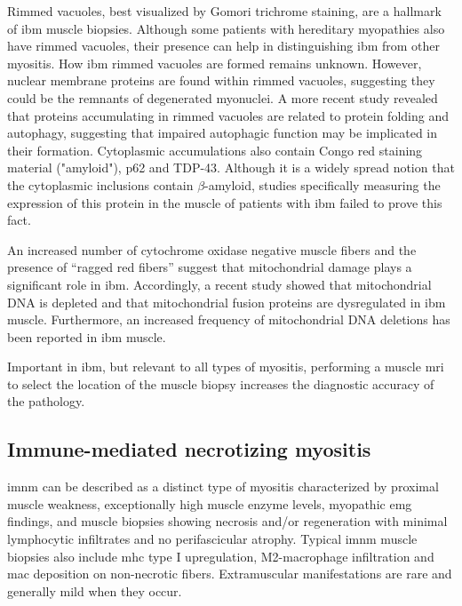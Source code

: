 Rimmed vacuoles, best visualized by Gomori trichrome staining, are a hallmark of \gls{ibm} muscle biopsies. Although some patients with hereditary myopathies also have rimmed vacuoles, their presence can help in distinguishing \gls{ibm} from other myositis.\cite{Dalakas2002} How \gls{ibm} rimmed vacuoles are formed remains unknown. However, nuclear membrane proteins are found within rimmed vacuoles, suggesting they could be the remnants of degenerated myonuclei.\cite{Greenberg2006,Nalbantoglu1994} A more recent study revealed that proteins accumulating in rimmed vacuoles are related to protein folding and autophagy, suggesting that impaired autophagic function may be implicated in their formation.\cite{Guttsches2017} Cytoplasmic accumulations also contain Congo red staining material ("amyloid"), p62 and TDP-43.\cite{Dalakas2002} Although it is a widely spread notion that the cytoplasmic inclusions contain $\beta$-amyloid, studies specifically measuring the expression of this protein in the muscle of patients with \gls{ibm} failed to prove this fact.\cite{Greenberg2010,Nalbantoglu1994}

An increased number of cytochrome oxidase negative muscle fibers and the presence of “ragged red fibers” suggest that mitochondrial damage plays a significant role in \gls{ibm}.\cite{Dalakas2002} Accordingly, a recent study showed that mitochondrial DNA is depleted and that mitochondrial fusion proteins are dysregulated in \gls{ibm} muscle.\cite{CatalanGarcia2016} Furthermore, an increased frequency of mitochondrial DNA deletions has been reported in \gls{ibm} muscle.\cite{Rygiel2016}

Important in \gls{ibm}, but relevant to all types of myositis, performing a muscle \gls{mri} to select the location of the muscle biopsy increases the diagnostic accuracy of the pathology.\cite{VanDeVlekkert2015}

\subsection{Immune-mediated necrotizing myositis}

\gls{imnm} can be described as a distinct type of myositis characterized by proximal muscle weakness, exceptionally high muscle enzyme levels, myopathic \gls{emg} findings, and muscle biopsies showing necrosis and/or regeneration with minimal lymphocytic infiltrates and no perifascicular atrophy. Typical \gls{imnm} muscle biopsies also include \gls{mhc} type I upregulation, M2-macrophage infiltration and \gls{mac} deposition on non-necrotic fibers.\cite{Watanabe2016,Chung2015} Extramuscular manifestations are rare and generally mild when they occur.\cite{PinalFernandez2017b,Suzuki2015,Tiniakou2017}

